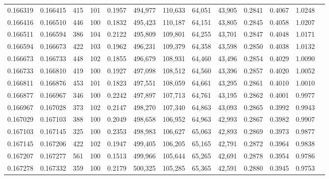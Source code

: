 \begin{tabular}{rrrrrrrrrrrrr}
0.166319 & 0.166415 &   415 & 101 &                                     0.1957 & 494,977 & 110,633 &  64,051 &  43,905 & 0.2841 & 0.4067 & 1.0248 \\
0.166416 & 0.166510 &   446 & 100 &                                     0.1832 & 495,423 & 110,187 &  64,151 &  43,805 & 0.2845 & 0.4058 & 1.0207 \\
0.166511 & 0.166594 &   386 & 104 &                                     0.2122 & 495,809 & 109,801 &  64,255 &  43,701 & 0.2847 & 0.4048 & 1.0171 \\
0.166594 & 0.166673 &   422 & 103 &                                     0.1962 & 496,231 & 109,379 &  64,358 &  43,598 & 0.2850 & 0.4038 & 1.0132 \\
0.166673 & 0.166733 &   448 & 102 &                                     0.1855 & 496,679 & 108,931 &  64,460 &  43,496 & 0.2854 & 0.4029 & 1.0090 \\
0.166733 & 0.166810 &   419 & 100 &                                     0.1927 & 497,098 & 108,512 &  64,560 &  43,396 & 0.2857 & 0.4020 & 1.0052 \\
0.166811 & 0.166876 &   453 & 101 &                                     0.1823 & 497,551 & 108,059 &  64,661 &  43,295 & 0.2861 & 0.4010 & 1.0010 \\
0.166877 & 0.166967 &   346 & 100 &                                     0.2242 & 497,897 & 107,713 &  64,761 &  43,195 & 0.2862 & 0.4001 & 0.9977 \\
0.166967 & 0.167028 &   373 & 102 &                                     0.2147 & 498,270 & 107,340 &  64,863 &  43,093 & 0.2865 & 0.3992 & 0.9943 \\
0.167029 & 0.167103 &   388 & 100 &                                     0.2049 & 498,658 & 106,952 &  64,963 &  42,993 & 0.2867 & 0.3982 & 0.9907 \\
0.167103 & 0.167145 &   325 & 100 &                                     0.2353 & 498,983 & 106,627 &  65,063 &  42,893 & 0.2869 & 0.3973 & 0.9877 \\
0.167145 & 0.167206 &   422 & 102 &                                     0.1947 & 499,405 & 106,205 &  65,165 &  42,791 & 0.2872 & 0.3964 & 0.9838 \\
0.167207 & 0.167277 &   561 & 100 &                                     0.1513 & 499,966 & 105,644 &  65,265 &  42,691 & 0.2878 & 0.3954 & 0.9786 \\
0.167278 & 0.167332 &   359 & 100 &                                     0.2179 & 500,325 & 105,285 &  65,365 &  42,591 & 0.2880 & 0.3945 & 0.9753 \\

\end{tabular}

